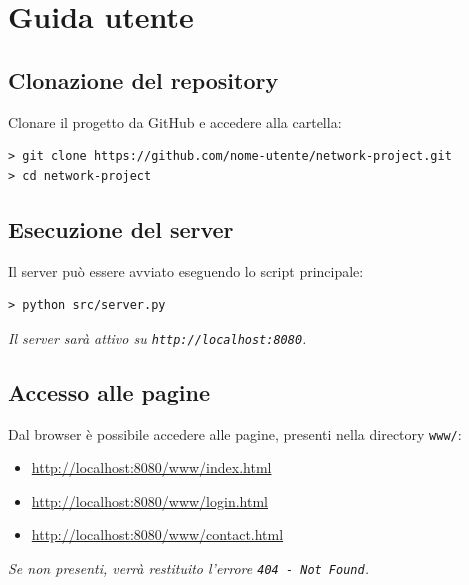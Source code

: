 \documentclass[a4paper,12pt]{report}
\begin{document}
\appendix
\chapter{Guida utente}
\section{Clonazione del repository}
Clonare il progetto da GitHub e accedere alla cartella:

\begin{verbatim}
> git clone https://github.com/nome-utente/network-project.git
> cd network-project
\end{verbatim}

\section{Esecuzione del server}
Il server può essere avviato eseguendo lo script principale:

\begin{verbatim}
> python src/server.py
\end{verbatim}

\noindent \textit{Il server sarà attivo su \texttt{http://localhost:8080}.}

\section{Accesso alle pagine}
Dal browser è possibile accedere alle pagine, presenti nella directory \texttt{www/}:

\begin{itemize}
    \item \url{http://localhost:8080/www/index.html}
    \item \url{http://localhost:8080/www/login.html}
    \item \url{http://localhost:8080/www/contact.html}
\end{itemize}

\noindent \textit{Se non presenti, verrà restituito l'errore \texttt{404 - Not Found}.}
\end{document}

